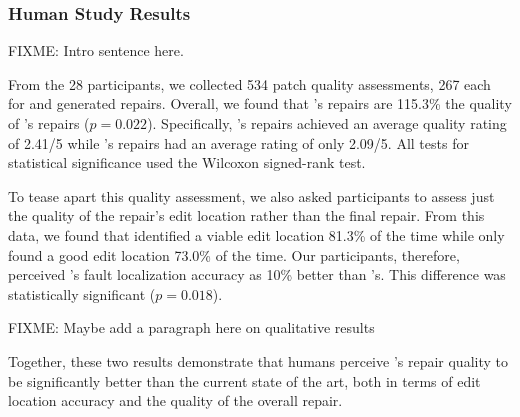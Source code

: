 \subsubsection{Human Study Results}
\label{subsubsec:study_res}

FIXME: Intro sentence here.

From the 28 participants, we collected 534 patch quality assessments, 267 each for
\toolname and \seminal generated repairs. Overall, we found that
\toolname's repairs are 115.3\% the quality of \seminal's repairs ($p=0.022$).
Specifically, \toolname's repairs achieved an average quality rating of 2.41/5 while
\seminal's repairs had an average rating of only 2.09/5. All tests for statistical significance 
used the Wilcoxon signed-rank test.

To tease apart this quality assessment, we also asked participants to assess just the
quality of the repair's edit location rather than the final repair. From this data, we found
that \toolname identified a viable edit location 81.3\% of the time while
\seminal only found a good edit location 73.0\% of the time. Our participants, therefore,
perceived \toolname's fault localization accuracy as 10\% better than \seminal's. 
This difference was statistically significant ($p=0.018$).

FIXME: Maybe add a paragraph here on qualitative results

Together, these two results demonstrate that humans perceive \toolname's 
repair quality to be significantly better than the current state of the art, both in 
terms of edit location accuracy and the quality of the overall repair.


